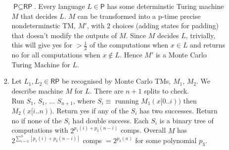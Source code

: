 \documentclass[a4paper, draft, 12pt]{article}
\begin{document}
\begin{enumerate}
\begin{enumerate}
\begin{enumerate}
  $\textsf{P} \subseteq \textsf{RP}$. Every language $L \in \textsf{P}$ has some 
  determinstic Turing machine $M$ that decides $L$. $M$ 
  can be transformed into a p-time precise nondeterminstic TM, $M'$, with 2 choices 
  (adding states for padding) that doesn't modify the outputs of $M$. 
  Since $M$ decides $L$, trivially, this will give yes for $> \frac{1}{2}$ of 
  the computations when $x \in L$ and returns no for all computations when $x \notin L$.
  Hence $M'$ is a Monte Carlo Turing Machine for $L$. 
  \item %
  Let $L_1, L_2 \in \textsf{RP}$ be recognised by Monte Carlo TMs, $M_1$, $M_2$. 
  We describe machine $M$ for $L$. 
  There are $n+1$ splits to check.\\
  Run $S_1$, $S_1$, ... $S_{n+1}$, where $S_i \equiv$ running $M_1(x[0..i))$ then $M_2(x[i..n))$. 
  Return yes if any of the $S_i$ has two successes. Return no if none of the $S_i$ had double success. 
  Each $S_i$ is a binary tree of computations with $2^{p_1(i) + p_2(n-i)}$ comps. 
  Overall $M$ has $2^{\sum^{n}_{i=0} [p_1(i) + p_2(n-i)]}$ comps $= 2^{p_3(n)}$ 
  for some polynomial $p_3$. 


\end{enumerate}
\end{enumerate}
\end{enumerate}
\end{document}
